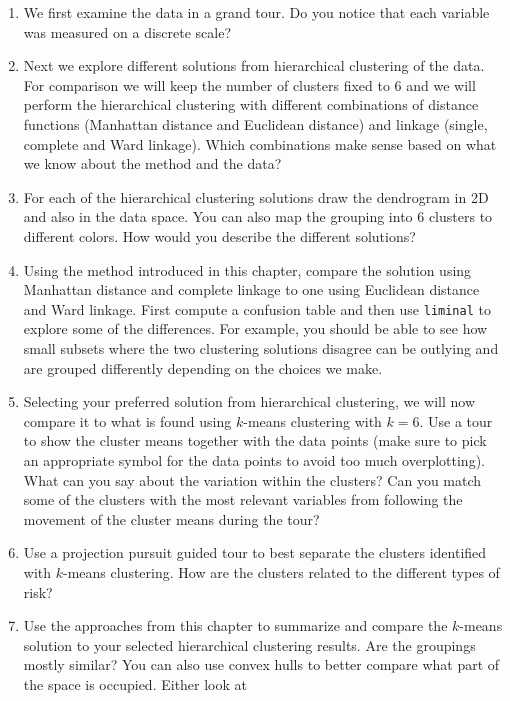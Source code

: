 \documentclass[
  letterpaper,
]{krantz}
\providecommand{\tightlist}{%
  \setlength{\itemsep}{0pt}\setlength{\parskip}{0pt}}\usepackage{longtable,booktabs,array}
\begin{document}
\begin{enumerate}
\def\labelenumi{\arabic{enumi}.}
\tightlist
\item
  We first examine the data in a grand tour. Do you notice that each
  variable was measured on a discrete scale?
\item
  Next we explore different solutions from hierarchical clustering of
  the data. For comparison we will keep the number of clusters fixed to
  6 and we will perform the hierarchical clustering with different
  combinations of distance functions (Manhattan distance and Euclidean
  distance) and linkage (single, complete and Ward linkage). Which
  combinations make sense based on what we know about the method and the
  data?
\item
  For each of the hierarchical clustering solutions draw the dendrogram
  in 2D and also in the data space. You can also map the grouping into 6
  clusters to different colors. How would you describe the different
  solutions?
\item
  Using the method introduced in this chapter, compare the solution
  using Manhattan distance and complete linkage to one using Euclidean
  distance and Ward linkage. First compute a confusion table and then
  use \texttt{liminal} to explore some of the differences. For example,
  you should be able to see how small subsets where the two clustering
  solutions disagree can be outlying and are grouped differently
  depending on the choices we make.
\item
  Selecting your preferred solution from hierarchical clustering, we
  will now compare it to what is found using \(k\)-means clustering with
  \(k=6\). Use a tour to show the cluster means together with the data
  points (make sure to pick an appropriate symbol for the data points to
  avoid too much overplotting). What can you say about the variation
  within the clusters? Can you match some of the clusters with the most
  relevant variables from following the movement of the cluster means
  during the tour?
\item
  Use a projection pursuit guided tour to best separate the clusters
  identified with \(k\)-means clustering. How are the clusters related
  to the different types of risk?
\item
  Use the approaches from this chapter to summarize and compare the
  \(k\)-means solution to your selected hierarchical clustering results.
  Are the groupings mostly similar? You can also use convex hulls to
  better compare what part of the space is occupied. Either look at

\end{enumerate}
\end{document}
